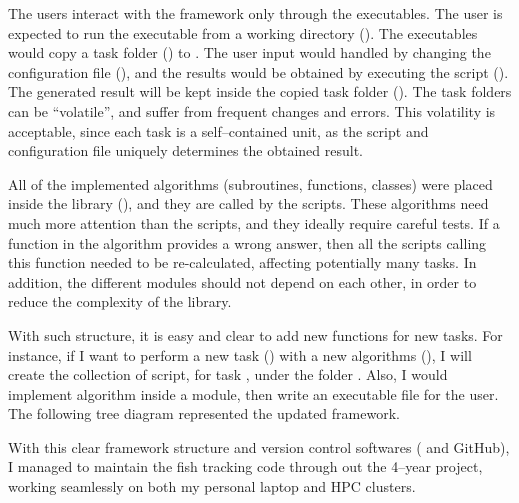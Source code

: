\documentclass[11pt,twoside]{report}
\begin{document}
The users interact with the framework only through the executables. The user is expected to run the executable from a working directory (). The executables would copy a task folder () to . The user input would handled by changing the configuration file (), and the results would be obtained by executing the script (). The generated result will be kept inside the copied task folder (). The task folders can be ``volatile'', and suffer from frequent changes and errors. This volatility is acceptable, since each task is a self--contained unit, as the script and configuration file uniquely determines the obtained result.

All of the implemented algorithms (subroutines, functions, classes) were placed inside the library (), and they are called by the scripts. These algorithms need much more attention than the scripts, and they ideally require careful tests. If a function in the algorithm provides a wrong answer, then all the scripts calling this function needed to be re-calculated, affecting potentially many tasks. In addition, the different modules should not depend on each other, in order to reduce the complexity of the library.

With such structure, it is easy and clear to add new functions for new tasks. For instance, if I want to perform a new task () with a new algorithms (), I will create the collection of script, for task , under the folder . Also, I would implement algorithm  inside a module, then write an executable file for the user. The following tree diagram represented the updated framework.

\begin{diagram}
\end{diagram}

\noindent With this clear framework structure and version control softwares ( and GitHub), I managed to maintain the fish tracking code through out the 4--year project, working seamlessly on both my personal laptop and HPC clusters.
\end{document}
